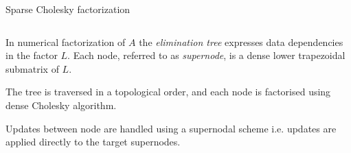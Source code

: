 \documentclass[unknownkeysallowed]{beamer}
\newcommand{\db}[1]{\textcolor{mblue}{#1\xspace}}
\begin{document}
\begin{frame}{Sparse Cholesky factorization}
  
  \begin{columns}  

    \begin{column}{0.6\textwidth}  

      In numerical factorization of \alert{$A$} the
      \db{\textit{elimination tree}} expresses data dependencies in
      the factor \alert{$L$}. Each node, referred to as
      \db{\textit{supernode}}, is a \alert{dense} lower trapezoidal
      \alert{submatrix} of \alert{$L$}.

      \vspace{0.4cm}

      The tree is traversed in a \db{topological order}, and each node is
      factorised using \alert{dense Cholesky algorithm}.

      \vspace{0.4cm}
      
      Updates between node are handled using a \alert{supernodal scheme}
      i.e. updates are applied directly to the target supernodes.
    \end{column}


\end{columns}
\end{frame}
\end{document}
